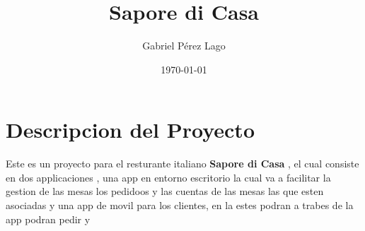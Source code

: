 \documentclass{article}
\title{Sapore di Casa}
\author{Gabriel Pérez Lago}
\date{\today}
\begin{document}
\maketitle

\newpage

\tableofcontents

\newpage

\section{Descripcion del Proyecto}
Este es un proyecto para el resturante italiano \textbf{Sapore di Casa} , el cual consiste en dos applicaciones , una app en entorno escritorio la cual va a facilitar la gestion de las mesas los pedidoos y las cuentas de las mesas las que esten asociadas y una app de movil para los clientes, en la estes podran a trabes de la app podran pedir y 
\end{document}
